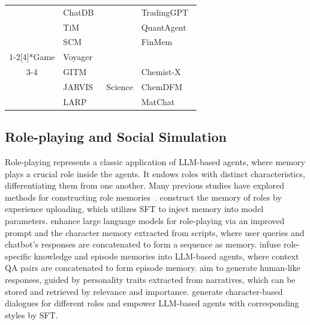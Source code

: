 \documentclass{article}
\theoremstyle{definition}
\theoremstyle{theorem}
\theoremstyle{proof}
\theoremstyle{remark}
\begin{document}
\begin{table}[tbp]
{\begin{tabular}{c|>{\centering\arraybackslash}p{4cm}|c|>{\centering\arraybackslash}p{4cm}}
				& ChatDB~\cite{chatdb} &       & TradingGPT~\cite{tradinggpt} \\
				& TiM~\cite{tim} &       & QuantAgent~\cite{quantagent} \\
				& SCM~\cite{scm} &       &  FinMem~\cite{finmem} \bigstrut[b]\\
				\cline{1-2}\multirow{4}[4]{*}{Game} & Voyager~\cite{voyager} &       & \citet{koa2024learning} \bigstrut\\
				\cline{3-4}      & GITM~\cite{gitm} & \multirow{3}[2]{*}{Science} & Chemist-X~\cite{chemistx} \bigstrut[t]\\
				& JARVIS~\cite{jarvis1} &       & ChemDFM~\cite{chemdfm} \\
				& LARP~\cite{larp} &       &  MatChat~\cite{matchat} \bigstrut[b]\\
				\hline
				\hline
			\end{tabular}
		}	
		\label{tab:application}
		\vspace{-0.6cm}
	\end{table}%
	
	
	\subsection{Role-playing and Social Simulation}
	
	Role-playing represents a classic application of LLM-based agents, where memory plays a crucial role inside the agents. It endows roles with distinct characteristics, differentiating them from one another. Many previous studies have explored methods for constructing role memories~\cite{character_llm,chatharuhi,rolellm,narrativeplay,characterglm}. \citet{character_llm} construct the memory of roles by experience uploading, which utilizes SFT to inject memory into model parameters. \citet{chatharuhi} enhance large language models for role-playing via an improved prompt and the character memory extracted from scripts, where user queries and chatbot’s responses are concatenated to form a sequence as memory. \citet{rolellm} infuse role-specific knowledge and episode memories into LLM-based agents, where context QA pairs are concatenated to form episode memory. \citet{narrativeplay} aim to generate human-like responses, guided by personality traits extracted from narratives, which can be stored and retrieved by relevance and importance. \citet{characterglm} generate
	character-based dialogues for different roles and empower LLM-based agents with corresponding styles by SFT.
	
\end{document}
